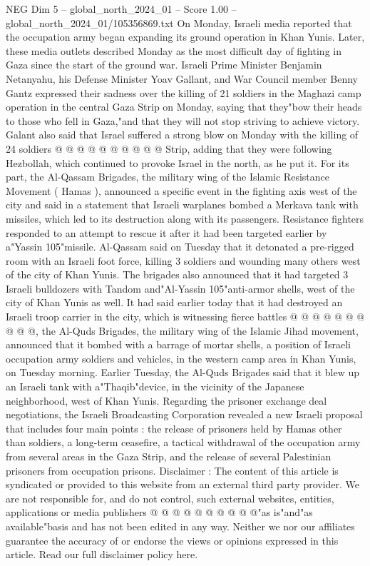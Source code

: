 \begin{textsample}{NEG Dim 5 – global\_north\_2024\_01 – Score 1.00 – global\_north\_2024\_01/105356869.txt}
On Monday, Israeli media reported that the occupation army began expanding its ground operation in Khan Yunis.
Later, these media outlets described Monday as the most difficult day of fighting in Gaza since the start of the ground war.
Israeli Prime Minister Benjamin Netanyahu, his Defense Minister Yoav Gallant, and War Council member Benny Gantz expressed their sadness over the killing of 21 soldiers in the Maghazi camp operation in the central Gaza Strip on Monday, saying that they"bow their heads to those who fell in Gaza,"and that they will not stop striving to achieve victory.
Galant also said that Israel suffered a strong blow on Monday with the killing of 24 soldiers @ @ @ @ @ @ @ @ @ @ Strip, adding that they were following Hezbollah, which continued to provoke Israel in the north, as he put it.
For its part, the Al-Qassam Brigades, the military wing of the Islamic Resistance Movement ( Hamas ), announced a specific event in the fighting axis west of the city and said in a statement that Israeli warplanes bombed a Merkava tank with missiles, which led to its destruction along with its passengers.
Resistance fighters responded to an attempt to rescue it after it had been targeted earlier by a"Yassin 105"missile.
Al-Qassam said on Tuesday that it detonated a pre-rigged room with an Israeli foot force, killing 3 soldiers and wounding many others west of the city of Khan Yunis.
The brigades also announced that it had targeted 3 Israeli bulldozers with Tandom and"Al-Yassin 105"anti-armor shells, west of the city of Khan Yunis as well.
It had said earlier today that it had destroyed an Israeli troop carrier in the city, which is witnessing fierce battles @ @ @ @ @ @ @ @ @ @, the Al-Quds Brigades, the military wing of the Islamic Jihad movement, announced that it bombed with a barrage of mortar shells, a position of Israeli occupation army soldiers and vehicles, in the western camp area in Khan Yunis, on Tuesday morning.
Earlier Tuesday, the Al-Quds Brigades said that it blew up an Israeli tank with a"Thaqib"device, in the vicinity of the Japanese neighborhood, west of Khan Yunis.
Regarding the prisoner exchange deal negotiations, the Israeli Broadcasting Corporation revealed a new Israeli proposal that includes four main points : the release of prisoners held by Hamas other than soldiers, a long-term ceasefire, a tactical withdrawal of the occupation army from several areas in the Gaza Strip, and the release of several Palestinian prisoners from occupation prisons.
Disclaimer : The content of this article is syndicated or provided to this website from an external third party provider.
We are not responsible for, and do not control, such external websites, entities, applications or media publishers @ @ @ @ @ @ @ @ @ @"as is"and"as available"basis and has not been edited in any way.
Neither we nor our affiliates guarantee the accuracy of or endorse the views or opinions expressed in this article.
Read our full disclaimer policy here.

\end{textsample}
